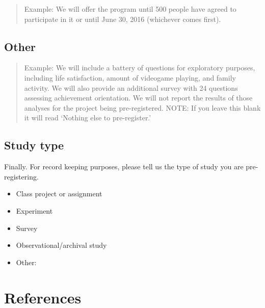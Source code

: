 \documentclass[]{article}
\providecommand{\tightlist}{%
\setlength{\itemsep}{0pt}\setlength{\parskip}{0pt}}
\newcounter{question}
\begin{document}
\begin{quote}
Example: We will offer the program until 500 people have agreed to
participate in it or until June 30, 2016 (whichever comes first).
\end{quote}

\hypertarget{other}{%
\subsection{Other}\label{other}}

\begin{quote}
Example: We will include a battery of questions for exploratory
purposes, including life satisfaction, amount of videogame playing, and
family activity. We will also provide an additional survey with 24
questions assessing achievement orientation. We will not report the
results of those analyses for the project being pre-registered. NOTE: If
you leave this blank it will read `Nothing else to pre-register.'
\end{quote}

\hypertarget{study-type}{%
\subsection{Study type}\label{study-type}}

Finally. For record keeping purposes, please tell us the type of study
you are pre-registering.

\begin{itemize}
\tightlist
\item
  Class project or assignment
\item
  Experiment
\item
  Survey
\item
  Observational/archival study
\item
  Other:
\end{itemize}

\hypertarget{references}{%
\section{References}\label{references}}

\hypertarget{section}{%
\subsection{}\label{section}}

\vspace{-2pc}
\setlength{\parindent}{-0.5in}
\setlength{\leftskip}{-1in}
\setlength{\parskip}{8pt}

\noindent
\end{document}
